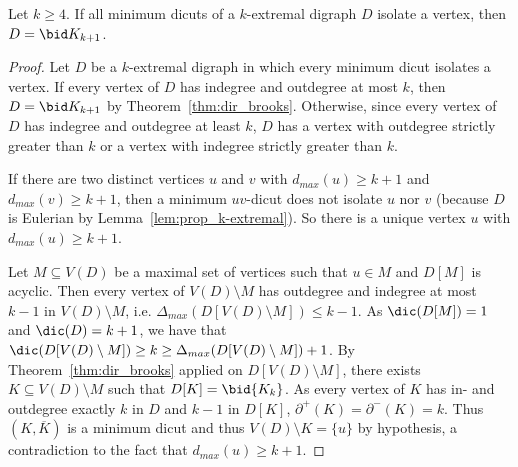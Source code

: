 \begin{lemma}\label{lem:all_cuts_isolate_vertices}
Let $k \geq 4$. If all minimum dicuts of a $k$-extremal digraph $D$ isolate a vertex, then $D = \bid K_{k+1}$.
\end{lemma}

\begin{proof}
    Let $D$ be a $k$-extremal digraph in which every minimum dicut isolates a vertex. If every vertex of $D$ has indegree and outdegree at most $k$, then $D = \bid K_{k+1}$ by Theorem~\ref{thm:dir_brooks}. Otherwise, since every vertex of $D$ has indegree and outdegree at least $k$, $D$ has a vertex with outdegree strictly greater than $k$ or a vertex with indegree strictly greater than $k$. 

    If there are two distinct vertices $u$ and $v$ with $d_{max}(u) \geq k+1$ and $d_{max}(v) \geq k+1$, then a minimum $uv$-dicut does not isolate $u$ nor $v$ (because $D$ is Eulerian by Lemma~\ref{lem:prop_k-extremal}).   
    So there is a unique vertex $u$ with $d_{max}(u) \geq k+1$. %
    
    
    Let $M \subseteq V(D)$ be a maximal set of vertices such that $u \in M$ and $D[M]$ is acyclic. Then every vertex of $V(D) \setminus M$ has outdegree and indegree at most $k-1$ in $V(D) \setminus M$, i.e. $\Delta_{max}(D[V(D) \setminus M]) \leq k - 1$. 
    As $\dic(D[M]) = 1$ and $\dic(D) = k+1$, we have that $\dic(D[V(D) \setminus M]) \geq k \geq \Delta_{max}(D[V(D) \setminus M]) +1$. 
    By Theorem~\ref{thm:dir_brooks} applied on $D[V(D) \setminus M]$, there exists $K \subseteq V(D) \setminus M$ such that $D[K] = \bid{K_{k}}$. As every vertex of $K$ has in- and outdegree exactly $k$ in $D$ and $k-1$ in $D[K]$, $\partial^+(K) = \partial^-(K)= k$. 
    Thus $(K, \overline K)$ is a minimum dicut and thus $V(D) \setminus K = \{u\}$ by hypothesis, a contradiction to the fact that $d_{max}(u) \geq k+1$. 
\end{proof}

